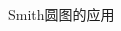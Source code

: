 \begin{frame}{Smith圆图的应用}
\begin{columns}
\begin{column}{0.6\linewidth}
    \end{column}
  \end{columns}
\end{frame}

